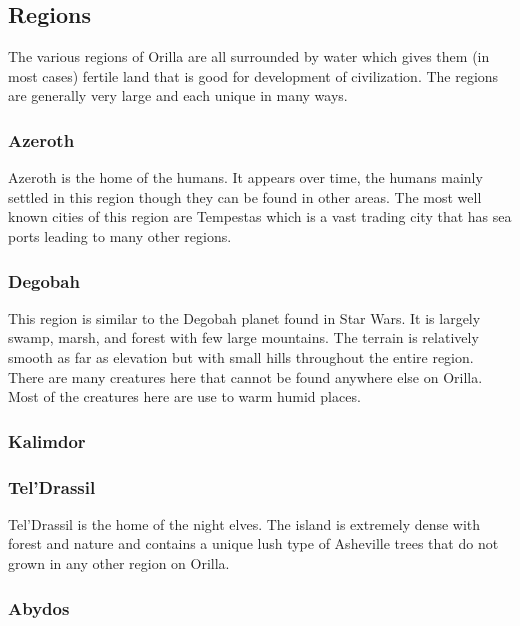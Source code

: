 \subsection{Regions}

The various regions of Orilla are all surrounded by water which gives them (in most cases) fertile land that is good for development of civilization. The regions are generally very large and each unique in many ways.

\subsubsection{Azeroth}

Azeroth is the home of the humans. It appears over time, the humans mainly settled in this region though they can be found in other areas. The most well known cities of this region are Tempestas which is a vast trading city that has sea ports leading to many other regions. 

\subsubsection{Degobah}

This region is similar to the Degobah planet found in Star Wars. It is largely swamp, marsh, and forest with few large mountains. The terrain is relatively smooth as far as elevation but with small hills throughout the entire region. There are many creatures here that cannot be found anywhere else on Orilla. Most of the creatures here are use to warm humid places. 

\subsubsection{Kalimdor}



\subsubsection{Tel'Drassil}

Tel'Drassil is the home of the night elves. The island is extremely dense with forest and nature and contains a unique lush type of Asheville trees that do not grown in any other region on Orilla.

\subsubsection{Abydos}

